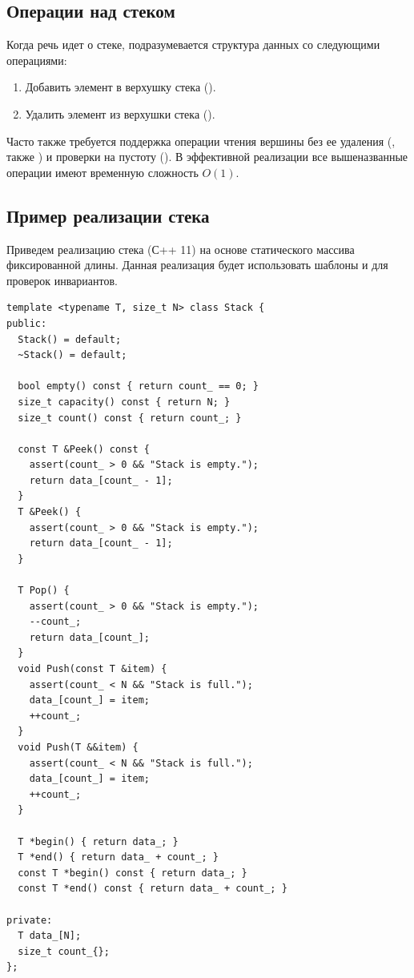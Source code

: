 \subsection{Операции над стеком}
Когда речь идет о стеке, подразумевается структура данных со следующими операциями:
\begin{enumerate}
  \item Добавить элемент в верхушку стека ().
  \item Удалить элемент из верхушки стека ().
\end{enumerate}

Часто также требуется поддержка операции чтения вершины без ее удаления (, также ) и
проверки на пустоту (). В эффективной реализации все вышеназванные операции имеют временную сложность
\(O(1)\).

\subsection{Пример реализации стека}
Приведем реализацию стека (С++ 11) на основе статического массива фиксированной длины. Данная реализация будет использовать шаблоны и
 для проверок инвариантов.

\begin{verbatim}
template <typename T, size_t N> class Stack {
public:
  Stack() = default;
  ~Stack() = default;

  bool empty() const { return count_ == 0; }
  size_t capacity() const { return N; }
  size_t count() const { return count_; }

  const T &Peek() const {
    assert(count_ > 0 && "Stack is empty.");
    return data_[count_ - 1];
  }
  T &Peek() {
    assert(count_ > 0 && "Stack is empty.");
    return data_[count_ - 1];
  }

  T Pop() {
    assert(count_ > 0 && "Stack is empty.");
    --count_;
    return data_[count_];
  }
  void Push(const T &item) {
    assert(count_ < N && "Stack is full.");
    data_[count_] = item;
    ++count_;
  }
  void Push(T &&item) {
    assert(count_ < N && "Stack is full.");
    data_[count_] = item;
    ++count_;
  }

  T *begin() { return data_; }
  T *end() { return data_ + count_; }
  const T *begin() const { return data_; }
  const T *end() const { return data_ + count_; }

private:
  T data_[N];
  size_t count_{};
};
\end{verbatim}

